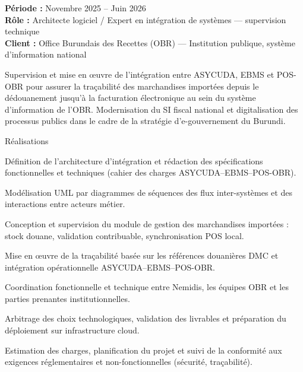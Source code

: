 
\cvgroupreset

\begin{cvgroup}

\begin{cvmetadata}
\textbf{Période :} Novembre 2025 – Juin 2026 \\
\textbf{Rôle :} Architecte logiciel / Expert en intégration de systèmes — supervision technique \\
\textbf{Client :} Office Burundais des Recettes (OBR) — Institution publique, système d'information national
\end{cvmetadata}

\begin{cvprojectsummary}
Supervision et mise en œuvre de l'intégration entre ASYCUDA, EBMS et POS-OBR pour assurer la traçabilité des marchandises importées depuis le dédouanement jusqu'à la facturation électronique au sein du système d'information de l'OBR. Modernisation du SI fiscal national et digitalisation des processus publics dans le cadre de la stratégie d'e-gouvernement du Burundi.
\end{cvprojectsummary}

\begin{cvdetailslist}{Réalisations}
  \item {Définition de l'architecture d'intégration et rédaction des spécifications fonctionnelles et techniques (cahier des charges ASYCUDA–EBMS–POS-OBR).}
  \item {Modélisation UML par diagrammes de séquences des flux inter-systèmes et des interactions entre acteurs métier.}
  \item {Conception et supervision du module de gestion des marchandises importées : stock douane, validation contribuable, synchronisation POS local.}
  \item {Mise en œuvre de la traçabilité basée sur les références douanières DMC et intégration opérationnelle ASYCUDA–EBMS–POS-OBR.}
  \item {Coordination fonctionnelle et technique entre Nemidis, les équipes OBR et les parties prenantes institutionnelles.}
  \item {Arbitrage des choix technologiques, validation des livrables et préparation du déploiement sur infrastructure cloud.}
  \item {Estimation des charges, planification du projet et suivi de la conformité aux exigences réglementaires et non-fonctionnelles (sécurité, traçabilité).}
\end{cvdetailslist}


\end{cvgroup}
